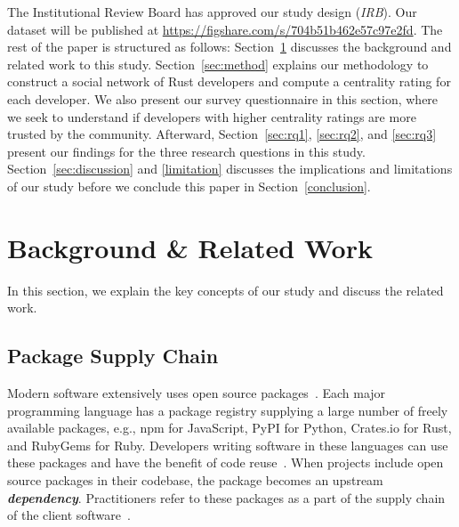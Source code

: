 \documentclass[10pt,journal,compsoc]{IEEEtran}
\begin{document}
The Institutional Review Board has approved our study design (\textit{IRB}). Our dataset will be published at \url{https://figshare.com/s/704b51b462e57c97e2fd}.
The rest of the paper is structured as follows: 
Section~\ref{relwork} discusses the background and related work to this study. Section~\ref{sec:method} explains our methodology to construct a social network of Rust developers and compute a centrality rating for each developer. We also present our survey questionnaire in this section, where we seek to understand if developers with higher centrality ratings are more trusted by the community. Afterward, Section~\ref{sec:rq1}, \ref{sec:rq2}, and \ref{sec:rq3} present our findings for the three research questions in this study. Section~\ref{sec:discussion} and \ref{limitation} discusses the implications and limitations of our study before we conclude this paper in Section~\ref{conclusion}.


\section{Background \& Related Work}
\label{relwork}

In this section, we explain the key concepts of our study and discuss the related work. 

\subsection{Package Supply Chain}
Modern software extensively uses open source packages~\cite{blackduck2021}. 
Each major programming language has a package registry supplying a large number of freely available packages, e.g., npm for JavaScript, PyPI for Python, Crates.io for Rust, and RubyGems for Ruby. 
Developers writing software in these languages can use these packages and have the benefit of code reuse~\cite{feitosa2020code}. When projects include open source packages in their codebase, the package becomes an upstream \textbf{\textit{dependency}}. 
Practitioners refer to these packages as a part of the supply chain of the client software~\cite{supplychain}. 
\end{document}
